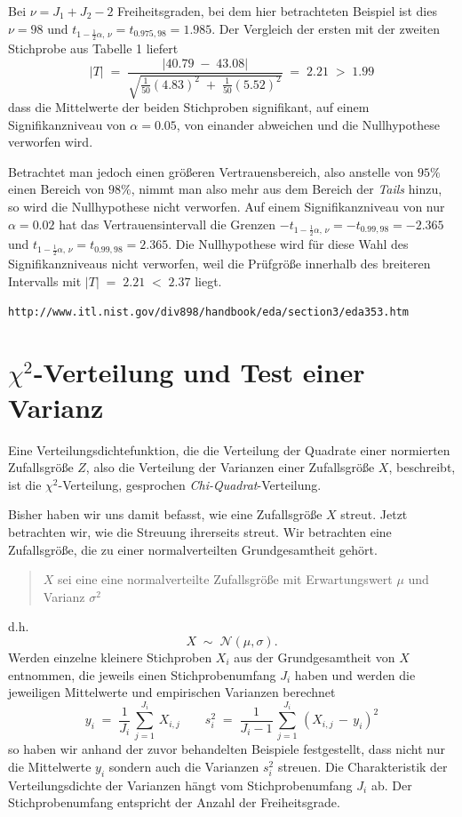 Bei $\nu = J_1 + J_2 - 2$ Freiheitsgraden, bei dem hier betrachteten Beispiel ist dies
$\nu = 98$ und $t_{1-\frac{1}{2} \alpha, \, \nu} = t_{0.975, 98} = 1.985$.
Der Vergleich der ersten mit der zweiten Stichprobe aus Tabelle 1 liefert
$$
|T| \; = \; \frac{|40.79 \; - \; 43.08|}{\sqrt{\frac{1}{50} (4.83)^2 \; + \; \frac{1}{50} (5.52)^2}}
\; = \; 2.21  \; > \; 1.99
$$
dass die Mittelwerte der beiden Stichproben signifikant, auf einem Signifikanzniveau von
$\alpha = 0.05$, von einander abweichen und die Nullhypothese verworfen wird.

Betrachtet man jedoch einen größeren Vertrauensbereich, also anstelle von $95 \%$ einen
Bereich von $98 \%$, nimmt man also mehr aus dem Bereich der \textsl{Tails} hinzu, so
wird die Nullhypothese nicht verworfen. Auf einem Signifikanzniveau von nur
$\alpha = 0.02$ hat das Vertrauensintervall die Grenzen
$-t_{1-\frac{1}{2} \alpha, \, \nu} = -t_{0.99, 98} = -2.365$ und
$t_{1-\frac{1}{2} \alpha, \, \nu} = t_{0.99, 98} = 2.365$. Die
Nullhypothese wird für diese Wahl des Signifikanzniveaus nicht verworfen,
weil die Prüfgröße innerhalb des breiteren Intervalls mit
$|T| \; = \; 2.21 \; < \; 2.37$ liegt.

\begin{verbatim}
http://www.itl.nist.gov/div898/handbook/eda/section3/eda353.htm
\end{verbatim}

\section{$\chi^2$-Verteilung und Test einer Varianz}


Eine Verteilungsdichtefunktion, die die Verteilung der Quadrate einer
 normierten Zufallsgröße $Z$,
also die Verteilung der Varianzen einer Zufallsgröße $X$, beschreibt, ist die
$\chi^2$-Verteilung, gesprochen \textsl{Chi-Quadrat}-Verteilung.


Bisher haben wir uns damit befasst, wie eine Zufallsgröße $X$ streut.
Jetzt betrachten wir, wie die Streuung ihrerseits streut.
Wir betrachten eine Zufallsgröße, die zu einer normalverteilten Grundgesamtheit gehört.
\begin{quote}
$X$ sei eine eine normalverteilte Zufallsgröße mit Erwartungswert $\mu$ und Varianz $\sigma^2$
\end{quote}
d.h.
\begin{equation}
X \; \sim \; \mathcal{N}(\mu, \sigma).
\end{equation}
Werden einzelne kleinere Stichproben $X_i$ aus der Grundgesamtheit von $X$ entnommen, die
jeweils einen Stichprobenumfang $J_i$ haben und werden die jeweiligen Mittelwerte und
empirischen Varianzen berechnet
\begin{equation}
y_i \; = \; \frac{1}{J_i} \, \sum_{j=1}^{J_i} \, X_{i,j} \qquad
 s_i^2 \; = \; \frac{1}{J_i-1} \, \sum_{j=1}^{J_i} \, (X_{i,j} \, - \, y_i)^2
\end{equation}
so haben wir anhand der zuvor behandelten Beispiele festgestellt,
dass nicht nur die Mittelwerte $y_i$ sondern auch die Varianzen $s_i^2$ streuen.
Die Charakteristik der Verteilungsdichte der Varianzen hängt vom
Stichprobenumfang $J_i$ ab. Der Stichprobenumfang entspricht der Anzahl der Freiheitsgrade.

